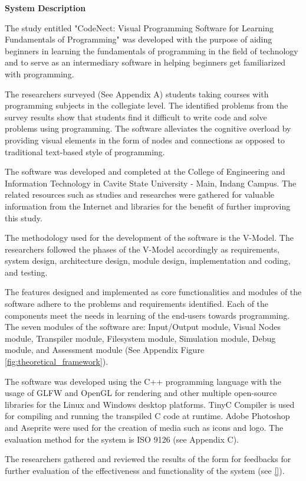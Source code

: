 \flushleft
\textbf{System Description}
\justifying

\parx
The study entitled "CodeNect: Visual Programming Software for Learning
Fundamentals of Programming" was developed with the purpose of aiding beginners
in learning the fundamentals of programming in the field of technology and to serve
as an intermediary software in helping beginners get familiarized with programming.

\parx
The researchers surveyed (See Appendix A) students taking
courses with programming subjects in the collegiate level. The identified
problems from the survey results show that students find it difficult to write
code and solve problems using programming. The software alleviates the
cognitive overload by providing visual elements in the form of nodes and
connections as opposed to traditional text-based style of programming.

\parx
The software was developed and completed at the College of Engineering and
Information Technology in Cavite State University - Main, Indang Campus. The
related resources such as studies and researches were gathered for valuable
information from the Internet and libraries for the benefit of further improving
this study.

\parx
The methodology used for the development of the software is the V-Model. The
researchers followed the phases of the V-Model accordingly as requirements,
system design, architecture design, module design, implementation and coding,
and testing.

\parx
The features designed and implemented as core functionalities and modules of the
software adhere to the problems and requirements identified. Each of the components
meet the needs in learning of the end-users towards programming. The seven modules
of the software are: Input/Output module, Visual Nodes module, Transpiler module,
Filesystem module, Simulation module, Debug module, and Assessment module
(See Appendix Figure \ref{fig:theoretical_framework}).

\parx
The software was developed using the C++ programming language with the usage of
GLFW and OpenGL for rendering and other multiple open-source libraries for the
Linux and Windows desktop platforms. TinyC Compiler is used for compiling and
running the transpiled C code at runtime. Adobe Photoshop and Aseprite were
used for the creation of media such as icons and logo. The evaluation method
for the system is ISO 9126 (see Appendix C).

\parx
The researchers gathered and reviewed the results of the form for feedbacks for
further evaluation of the effectiveness and functionality of the system (see \ref{}).
